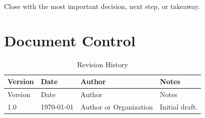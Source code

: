 \documentclass[11pt,a4paper,oneside]{scrreprt}
\newcommand{\DocumentAuthor}{Author or Organization}
\newcommand{\DocumentDate}{\today}
\begin{document}
Close with the most important decision, next step, or takeaway.

\printbibliography[heading=bibintoc]

\appendix

\chapter{Document Control}
\label{app:document-control}

\begin{longtable}{p{} p{} p{} p{}}
  \caption{Revision History}
  \label{tab:revision-history} \\
  \toprule
  Version & Date & Author & Notes \\
  \midrule
  \endfirsthead
  \toprule
  Version & Date & Author & Notes \\
  \midrule
  \endhead
  1.0 & \DocumentDate & \DocumentAuthor & Initial draft. \\
  \bottomrule
\end{longtable}

\printindex
\end{document}
